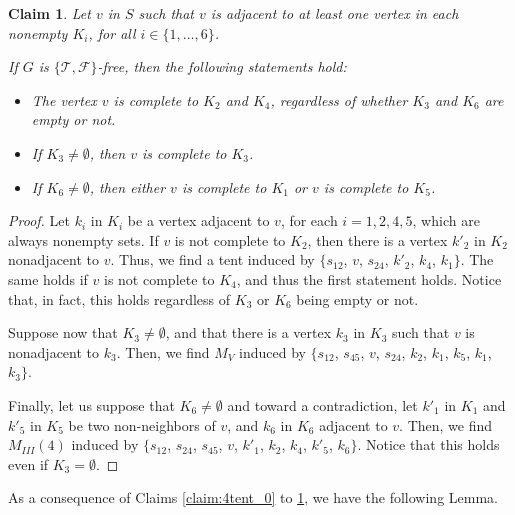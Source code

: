 \documentclass[12pt]{book}
\theoremstyle{plain}
\newtheorem{claim}[teo]{Claim}
\theoremstyle{remark}
\begin{document}
\begin{claim} \label{claim:4tent_5}
	Let $v$ in $S$ such that $v$ is adjacent to at least one vertex in each nonempty $K_i$, for all $i\in \{1, \ldots, 6\}$.
	
	If $G$ is $\{ \mathcal{T}, \mathcal{F} \}$-free, then the following statements hold:
	\begin{itemize}
		\item The vertex $v$ is complete to $K_2$ and $K_4$, regardless of whether $K_3$ and $K_6$ are empty or not.
		\item If $K_3 \neq \emptyset$, then $v$ is complete to $K_3$. 
		\item If $K_6 \neq \emptyset$, then either $v$ is complete to $K_1$ or $v$ is complete to $K_5$. 	
	\end{itemize}
\end{claim} 

\begin{proof}
		Let $k_i$ in $K_i$ be a vertex adjacent to $v$, for each $i=1, 2, 4, 5$, which are always nonempty sets. If $v$ is not complete to $K_2$, then there is a vertex $k'_2$ in $K_2$ nonadjacent to $v$. Thus, we find a tent induced by $\{ s_{12}$, $v$, $s_{24}$, $k'_2$, $k_4$, $ k_1\}$. The same holds if $v$ is not complete to $K_4$, and thus the first statement holds. Notice that, in fact, this holds regardless of $K_3$ or $K_6$ being empty or not.
		
		Suppose now that $K_3 \neq \emptyset$, and that there is a vertex $k_3$ in $K_3$ such that $v$ is nonadjacent to $k_3$. Then, we find $M_V$ induced by $\{ s_{12}$, $s_{45}$, $v$, $s_{24}$, $k_2$, $k_1$, $k_5$, $k_1$, $k_3 \}$.
		
		Finally, let us suppose that $K_6 \neq \emptyset$ and toward a contradiction, let $k'_1$ in $K_1$ and $k'_5$ in $K_5$ be two non-neighbors of $v$, and $k_6$ in $K_6$ adjacent to $v$.	 Then, we find $M_{III}(4)$ induced by $\{ s_{12}$, $s_{24}$, $s_{45}$, $v$, $k'_1$, $k_2$, $k_4$, $k'_5$, $k_6 \}$. Notice that this holds even if $K_3 = \emptyset$. 
\end{proof}

As a consequence of Claims \ref{claim:4tent_0} to \ref{claim:4tent_5}, we have the following Lemma.
\end{document}
